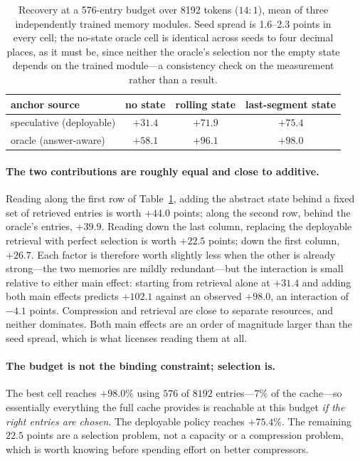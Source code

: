 \documentclass[11pt]{article}
\begin{document}
\begin{table}[ht]
\centering
\begin{tabular}{lccc}
\toprule
anchor source & no state & rolling state & last-segment state \\
\midrule
speculative (deployable) & $+31.4$ & $+71.9$ & $+75.4$ \\
oracle (answer-aware)    & $+58.1$ & $+96.1$ & $\mathbf{+98.0}$ \\
\bottomrule
\end{tabular}
\caption{Recovery at a 576-entry budget over 8192 tokens ($14{:}1$), mean of
three independently trained memory modules. Seed spread is 1.6--2.3 points in
every cell; the no-state oracle cell is identical across seeds to four decimal
places, as it must be, since neither the oracle's selection nor the empty state
depends on the trained module---a consistency check on the measurement rather
than a result.}
\label{tab:twobytwo}
\end{table}

\paragraph{The two contributions are roughly equal and close to additive.}
Reading along the first row of Table~\ref{tab:twobytwo}, adding the abstract state behind a fixed set of
retrieved entries is worth $+44.0$ points; along the second row, behind the
oracle's entries, $+39.9$. Reading down the last column, replacing the deployable
retrieval with perfect selection is worth $+22.5$ points; down the first column,
$+26.7$. Each factor is therefore worth slightly less when the other is already
strong---the two memories are mildly redundant---but the interaction is small
relative to either main effect: starting from retrieval alone at $+31.4$ and
adding both main effects predicts $+102.1$ against an observed $+98.0$, an
interaction of $-4.1$ points. Compression and retrieval are close to separate
resources, and neither dominates. Both main effects are an order of magnitude
larger than the seed spread, which is what licenses reading them at all.

\paragraph{The budget is not the binding constraint; selection is.}
The best cell reaches $+98.0\%$ using $576$ of $8192$ entries---$7\%$ of the
cache---so essentially everything the full cache provides is reachable at this
budget \emph{if the right entries are chosen}. The deployable policy reaches
$+75.4\%$. The remaining $22.5$ points are a selection problem, not a capacity or
a compression problem, which is worth knowing before spending effort on better
compressors.
\end{document}
